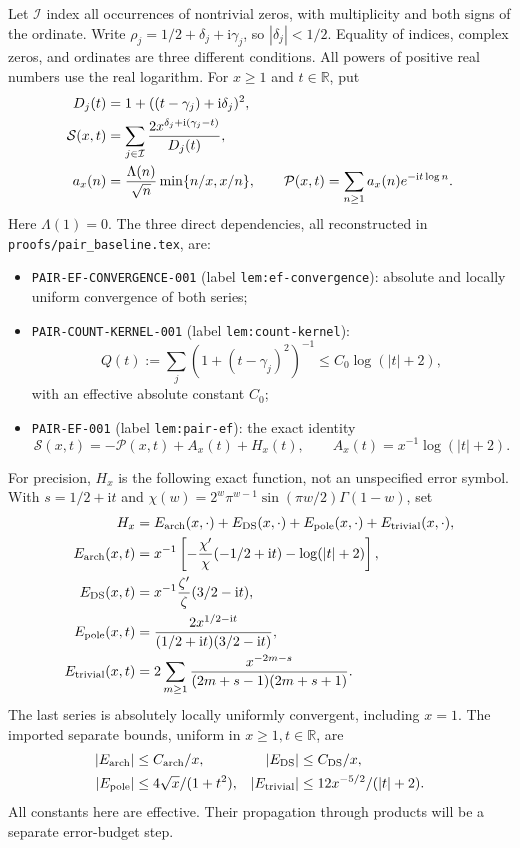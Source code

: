 \documentclass[11pt]{article}
\newcommand{\ii}{\mathrm i}
\newcommand{\ZS}{\mathcal S}
\newcommand{\PS}{\mathcal P}
\begin{document}
Let \(\mathcal I\) index all occurrences of nontrivial zeros, with
multiplicity and both signs of the ordinate. Write
\(\rho_j=1/2+\delta_j+\ii\gamma_j\), so \(|\delta_j|<1/2\).
Equality of indices, complex zeros, and ordinates are three different
conditions. All powers of positive real numbers use the real logarithm.
For \(x\geq1\) and \(t\in\mathbb R\), put
\begin{align}
 D_j(t)&=1+((t-\gamma_j)+\ii\delta_j)^2,\notag\\
 \ZS(x,t)&=\sum_{j\in\mathcal I}
       \frac{2x^{\delta_j+\ii(\gamma_j-t)}}{D_j(t)},
       \label{eq:triple-S}\\
 a_x(n)&=\frac{\Lambda(n)}{\sqrt n}\min\{n/x,x/n\},\qquad
 \PS(x,t)=\sum_{n\geq1}a_x(n)e^{-\ii t\log n}.
       \label{eq:triple-P}
\end{align}
Here \(\Lambda(1)=0\). The three direct dependencies, all reconstructed
in \texttt{proofs/pair\_baseline.tex}, are:
\begin{itemize}
 \item \texttt{PAIR-EF-CONVERGENCE-001} (label \texttt{lem:ef-convergence}):
 absolute and locally uniform convergence of both series;
 \item \texttt{PAIR-COUNT-KERNEL-001} (label \texttt{lem:count-kernel}):
 \[
 Q(t):=\sum_j(1+(t-\gamma_j)^2)^{-1}\leq C_0\log(|t|+2),
 \]
 with an effective absolute constant \(C_0\);
 \item \texttt{PAIR-EF-001} (label \texttt{lem:pair-ef}): the exact identity
 \begin{equation}\label{eq:triple-EF}
 \ZS(x,t)=-\PS(x,t)+A_x(t)+H_x(t),\qquad
 A_x(t)=x^{-1}\log(|t|+2).
 \end{equation}
\end{itemize}
For precision, \(H_x\) is the following exact function, not an unspecified
error symbol. With \(s=1/2+\ii t\) and
\(\chi(w)=2^w\pi^{w-1}\sin(\pi w/2)\Gamma(1-w)\), set
\begin{align}
 H_x&=E_{\rm arch}(x,\cdot)+E_{\rm DS}(x,\cdot)
             +E_{\rm pole}(x,\cdot)+E_{\rm trivial}(x,\cdot),\notag\\
 E_{\rm arch}(x,t)&=x^{-1}\left[-\frac{\chi'}{\chi}(-1/2+\ii t)
                                     -\log(|t|+2)\right],\notag\\
 E_{\rm DS}(x,t)&=x^{-1}\frac{\zeta'}{\zeta}(3/2-\ii t),\notag\\
 E_{\rm pole}(x,t)&=\frac{2x^{1/2-\ii t}}{(1/2+\ii t)(3/2-\ii t)},\notag\\
 E_{\rm trivial}(x,t)&=2\sum_{m\geq1}
       \frac{x^{-2m-s}}{(2m+s-1)(2m+s+1)}.\label{eq:triple-H}
\end{align}
The last series is absolutely locally uniformly convergent, including
\(x=1\). The imported separate bounds, uniform in \(x\geq1,t\in\mathbb R\), are
\begin{align}
 |E_{\rm arch}|&\leq C_{\rm arch}/x,&
 |E_{\rm DS}|&\leq C_{\rm DS}/x,\notag\\
 |E_{\rm pole}|&\leq4\sqrt{x}/(1+t^2),&
 |E_{\rm trivial}|&\leq12x^{-5/2}/(|t|+2).\label{eq:triple-H-bounds}
\end{align}
All constants here are effective. Their propagation through products
will be a separate error-budget step.
\end{document}
